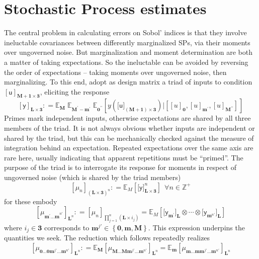 \documentclass[preprint,12pt]{elsarticle}
\newcommand*{\M}[1]{\ensuremath{#1}\xspace}
\newcommand*{\x}{\times}
\newcommand*{\mi}[1]{\mathbf{#1}}
\newcommand*{\st}[1]{\mathbb{#1}}
\newcommand*{\rv}[1]{\mathsf{#1}}
\newcommand*{\te}[2][]{\left\lbrack{#2}\right\rbrack_{#1}}
\newcommand*{\tte}[2][]{\lbrack{#2}\rbrack_{#1}}
\newcommand*{\deq}{\M{\mathrel{\mathop:}=}}
\newcommand*{\ev}[3][]{\mathbb{E}_{#3}^{#1}\!\left\lbrack{#2}\right\rbrack}
\newcommand*{\evt}[3][]{\mathbb{E}_{#3}^{#1}\!#2}
\newcommand*{\set}[1]{\M{\left\lbrace{#1}\right\rbrace}}
\begin{document}
\section{Stochastic Process estimates}\label{sec:SPEst}
    The central problem in calculating errors on Sobol' indices is that they involve ineluctable covariances between differently marginalized SPs, via their moments over ungoverned noise. But marginalization and moment determination are both a matter of taking expectations. So the ineluctable can be avoided by reversing the order of expectations -- taking moments over ungoverned noise, then marginalizing.
    To this end, adopt as design matrix a triad of inputs to condition $\te[\mi{M+1\x 3}]{\rv{u}}$, eliciting the response
    \begin{equation}\label{def:SPEst:y}
        \te[\mi{L\x 3}]{\rv{y}} \deq 
        \evt{\;\evt{\;\ev{y(\tte[\mi{(M+1)\x 3}]{\rv{u}}) 
            \big\vert \te[]{\te[\mi{0}]{u}, \te[\mi{m^{\prime}}]{u}, \te[\mi{M^{\prime\prime}}]{u}}}{\mi{0^{\prime\prime}}}}
        {\mi{M^{\prime}-m^{\prime}}}}{\mi{M}}
    \end{equation}
    Primes mark independent inputs, otherwise expectations are shared by all three members of the triad. It is not always obvious whether inputs are independent or shared by the triad, but this can be mechanically checked against the measure of integration behind an expectation. Repeated expectations over the same axis are rare here, usually indicating that apparent repetitions must be ``primed''. The purpose of the triad is to interrogate its response for moments in respect of ungoverned noise (which is shared by the triad members)
    \begin{equation}\label{def:SPEst:mu}
            \te[(\mi{L\x 3})^{n}]{\mu_{n}} \deq \ev{\tte[\mi{L\x 3}]{\rv{y}}^{n}}{M} \ \ \forall n \in \st{Z}^{+}
    \end{equation}
    for these embody
    \begin{equation*}
        \te[\mi{L}^{n}]{\mu_{\mi{m^{\prime}\ldots m}^{n\prime}}} \deq \te[\prod_{j=1}^{n}(\mi{L\x}i_{j})]{\mu_{n}} = \ev{\tte[\mi{L}]{\rv{y}_{\mi{m}^{\prime}}}\otimes\cdots\otimes\tte[\mi{L}]{\rv{y}_{\mi{m}^{n\prime}}}}{M}
    \end{equation*}
    where $i_{j}\in \mi{3}$ corresponds to $\mi{m}^{j\prime} \in \set{\mi{0},\mi{m},\mi{M}}$. This expression underpins the quantities we seek. The reduction which follows repeatedly realizes
    \begin{equation}\label{eq:SPEstimates:reduction}
        \te[\mi{L}^{n}]{\mu_{\mi{0\ldots 0}\mi{m}^{j\prime}\mi{\ldots m}^{n\prime}}} \deq 
        \evt{\te[\mi{L}^{n}]{\mu_{\mi{M\ldots M}\mi{m}^{j\prime}\mi{\ldots m}^{n\prime}}}}{\mi{M}} = 
        \evt{\te[\mi{L}^{n}]{\mu_{\mi{m\ldots m}\mi{m}^{j\prime}\mi{\ldots m}^{n\prime}}}}{\mi{m}}
    \end{equation}
\end{document}
